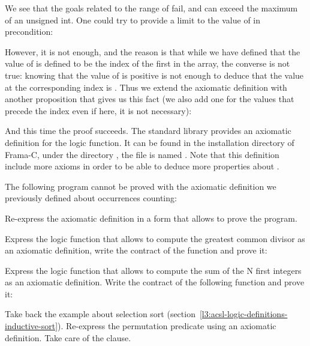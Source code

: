 We see that the goals related to the range of  fail, and
 can exceed the maximum of an unsigned int. One could try
to provide a limit to the value of  in precondition:






However, it is not enough, and the reason is that while we have defined
that the value of  is defined to be the index of
the first  in the array, the converse is
not true: knowing that the value of  is positive
is not enough to deduce that the value at the corresponding index is
. Thus we extend the axiomatic definition
with another proposition that gives us this fact (we also add one for the
values that precede the  index even if here, it is
not necessary):







And this time the proof succeeds. The standard library provides an
axiomatic definition for the  logic function. It can
be found in the installation directory of Frama-C, under the directory
, the file is named .
Note that this definition include more axioms in order to be able to
deduce more properties about .







The following program cannot be proved with the axiomatic definition we
previously defined about occurrences counting:




Re-express the axiomatic definition in a form that allows to prove the
program.




Express the logic function that allows to compute the greatest common divisor as
an axiomatic definition, write the contract of the  function and
prove it:






Express the logic function that allows to compute the sum of the N first
integers as an axiomatic definition. Write the contract of the following
 function and prove it:






Take back the example about selection sort
(section~\ref{l3:acsl-logic-definitions-inductive-sort}). Re-express the
permutation predicate using an axiomatic definition. Take care of the
 clause.


